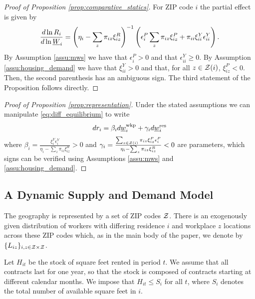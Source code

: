 \begin{proof}[Proof of Proposition \ref{prop:comparative_statics}]
    For ZIP code $i$ the partial effect is given by
    $$
    \frac{d\ln R_i}{d\ln\underline{W}_{i}} 
      = \left(\eta_i - \sum_z \pi_{iz} \xi^R_{iz}\right)^{-1} 
        \left(\epsilon_{i}^P \sum_z \pi_{iz}\xi^P_{iz} 
             + \pi_{ii}\xi^Y_{ii}\epsilon_{ii}^Y \right) .
    $$
    By Assumption \ref{assu:mws} we have that $\epsilon_{i}^P>0$ and that 
    $\epsilon_{ii}^Y\geq0$.
    By Assumption \ref{assu:housing_demand} we have that $\xi^Y_{ii}>0$ and that, 
    for all $z\in\mathcal{Z}(i)$, $\xi^P_{iz}<0$.
    Then, the second parenthesis has an ambiguous sign.
    The third statement of the Proposition follows directly.
\end{proof}

\begin{proof}[Proof of Proposition \ref{prop:representation}]
    Under the stated assumptions we can manipulate \eqref{eq:diff_equilibrium} 
    to write
    $$
    d r_{i} = \beta_i d \underline{w}_{i}^{\text{wkp}} + \gamma_i d \underline{w}^{\text{res}}_i
    $$
    where
    $\beta_i = \frac{\xi_{i}^{Y}\epsilon_i^{Y}}
                     {\eta_{i} - \sum_z \pi_{iz} \xi_{iz}^R} 
              > 0$ and
    $\gamma_i = \frac{\sum_{z\in\mathcal{Z}(i)}\pi_{iz}\xi_{iz}^{P}\epsilon_{i}^{P}}
                    {\eta_{i} - \sum_z \pi_{iz} \xi_{iz}^R} 
              < 0$
    are parameters, which signs can be verified using
    Assumptions \ref{assu:mws} and \ref{assu:housing_demand}.
\end{proof}

\subsection{A Dynamic Supply and Demand Model}\label{sec:dyn_theory_model}

The geography is represented by a set of ZIP codes $\mathcal{Z}$.
There is an exogenously given distribution of workers with differing 
residence $i$ and workplace $z$ locations across these ZIP codes which,
as in the main body of the paper, we denote by $\{L_{iz}\}_{i,z\in\mathcal{Z}\times\mathcal{Z}}$.

Let $H_{it}$ be the stock of square feet rented in period $t$.
We assume that all contracts last for one year, so that
the stock is composed of contracts starting at different calendar months. 
We impose that $H_{it} \leq S_i$ for all $t$, 
where $S_i$ denotes the total number of available square feet in $i$.

